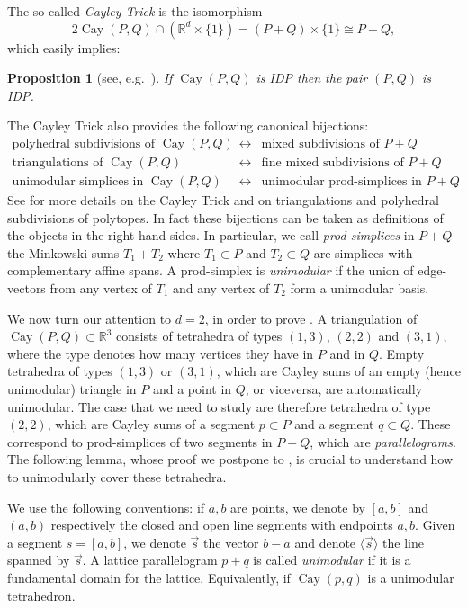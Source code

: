 \documentclass{amsart}
\theoremstyle{plain}
\newtheorem{proposition}[theorem]{Proposition}
\theoremstyle{definition}
\newcommand{\R}{ \ensuremath{\mathbb{R}}}
\renewcommand{\vec}[1]{\overrightarrow#1}
\newcommand{\vecline}[1]{\langle \vec #1 \rangle}
\newcommand{\cayley}{\operatorname{Cay}}
\begin{document}
The so-called \emph{Cayley Trick} is the isomorphism
\[
2\cayley(P, Q) \cap (\R^d\times \{1\}) = (P+Q) \times \{1\} \cong P+Q,
\]
which easily implies:

\begin{proposition}[see, e.g.~]
\label{prop:mixedIDP}
If $\cayley(P,Q)$ is IDP then the pair $(P,Q)$ is IDP.
\end{proposition} 


The Cayley Trick also provides the following canonical bijections:
\[
\begin{array}{ccc}
\text{polyhedral subdivisions of $\cayley(P,Q)$} &\leftrightarrow& \text{mixed subdivisions of $P + Q$}\\
\text{triangulations of $\cayley(P,Q)$} &\leftrightarrow& \text{fine mixed subdivisions of $P + Q$}\\
\text{unimodular simplices in $\cayley(P,Q)$} &\leftrightarrow& \text{unimodular prod-simplices in $P + Q$}.
\end{array}
\]
See \cite{DLRS2010} for more details on the Cayley Trick and on triangulations and polyhedral subdivisions of polytopes.
In fact these bijections can be taken as definitions of the objects in the right-hand sides. In particular, 
we call \emph{prod-simplices} in $P+Q$ the Minkowski sums $T_1+T_2$ where $T_1\subset P$ and $T_2\subset Q$ are simplices with complementary affine spans. A prod-simplex is \emph{unimodular} if the union of edge-vectors from any vertex of $T_1$ and any vertex of $T_2$ form a unimodular basis.

\medskip

We now turn our attention to $d=2$, in order to prove . A triangulation of $\cayley(P,Q)\subset \R^3$ consists of tetrahedra of types $(1,3)$, $(2,2)$ and $(3,1)$, where the type denotes how many vertices they have in $P$ and in $Q$. Empty tetrahedra of types $(1,3)$ or $(3,1)$, which are Cayley sums of an empty (hence unimodular) triangle in $P$ and a point in $Q$, or viceversa, are automatically unimodular. The case that we need to study are therefore tetrahedra of type $(2,2)$, which are Cayley sums of a segment $p\subset P$ and a segment $q\subset Q$. These correspond to prod-simplices of two segments in $P+Q$, which are \emph{parallelograms}.
The following lemma, whose proof we postpone to , is crucial to understand how to unimodularly cover these tetrahedra. 

We use the following conventions: if $a, b$ are points, we denote by $[a,b]$ and $(a,b)$ respectively the closed and open line segments with endpoints $a,b$. Given a segment $s=[a,b]$, we denote $\vec s$ the vector $b-a$ and denote $\vecline s$ the line spanned by $\vec s$. A lattice parallelogram $p+q$ is called \emph{unimodular} if it is a fundamental domain for the lattice. Equivalently, if $\cayley(p,q)$ is a unimodular tetrahedron.
\end{document}
